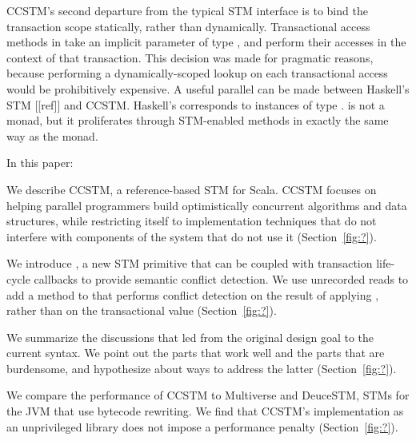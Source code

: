 CCSTM's second departure from the typical STM interface is to bind the
transaction scope statically, rather than dynamically.  Transactional access
methods in  take an implicit parameter of type , and
perform their accesses in the context of that transaction.  This decision
was made for pragmatic reasons, because performing a dynamically-scoped
lookup on each transactional access would be prohibitively expensive.
A useful parallel can be made between Haskell's STM [[ref]] and CCSTM.
Haskell's  corresponds to instances of type .
 is not a monad, but it proliferates through STM-enabled
methods in exactly the same way as the  monad.

In this paper:
\begin{packed_enum}

\item We describe CCSTM, a reference-based STM for Scala.  CCSTM focuses on
helping parallel programmers build optimistically concurrent algorithms
and data structures, while restricting itself to implementation techniques
that do not interfere with components of the system that do not use it
(Section~\ref{fig:?}).

\item We introduce , a new STM primitive that can be coupled with
transaction life-cycle callbacks to provide semantic conflict detection.  We use
unrecorded reads to add a  method to  that performs
conflict detection on the result of applying , rather than on the
transactional value (Section~\ref{fig:?}).

\item We summarize the discussions that led from the original design goal to
the current syntax.  We point out the parts that work well and the parts that
are burdensome, and hypothesize about ways to address the latter
(Section~\ref{fig:?}).

\item We compare the performance of CCSTM to Multiverse and DeuceSTM, STMs for
the JVM that use bytecode rewriting.  We find that CCSTM's implementation as an
unprivileged library does not impose a performance penalty
(Section~\ref{fig:?}).  

\end{packed_enum}

